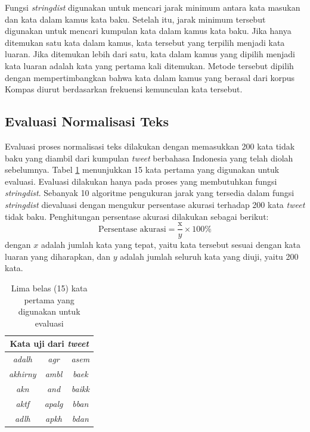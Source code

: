 Fungsi \textit{stringdist} digunakan untuk mencari jarak minimum antara kata masukan dan kata dalam kamus kata baku. Setelah itu, jarak minimum tersebut digunakan untuk mencari kumpulan kata dalam kamus kata baku. Jika hanya ditemukan satu kata dalam kamus, kata tersebut yang terpilih menjadi kata luaran. Jika ditemukan lebih dari satu, kata dalam kamus yang dipilih menjadi kata luaran adalah kata yang pertama kali ditemukan. Metode tersebut dipilih dengan mempertimbangkan bahwa kata dalam kamus yang berasal dari korpus Kompas diurut berdasarkan frekuensi kemunculan kata tersebut.

\subsection{Evaluasi Normalisasi Teks}

Evaluasi proses normalisasi teks dilakukan dengan memasukkan 200 kata tidak baku yang diambil dari kumpulan \textit{tweet} berbahasa Indonesia yang telah diolah sebelumnya. Tabel \ref{tbl:ipb_tweet} menunjukkan 15 kata pertama yang digunakan untuk evaluasi. Evaluasi dilakukan hanya pada proses yang membutuhkan fungsi \textit{stringdist}. Sebanyak 10 algoritme pengukuran jarak yang tersedia dalam fungsi \textit{stringdist} dievaluasi dengan mengukur persentase akurasi terhadap 200 kata \textit{tweet} tidak baku. Penghitungan persentase akurasi dilakukan sebagai berikut:
\begin{equation*}
	\text{Persentase akurasi}=\frac{\text{x}}{y} \times 100\%
\end{equation*}
\noindent
dengan $x$ adalah jumlah kata yang tepat, yaitu kata tersebut sesuai dengan kata luaran yang diharapkan, dan $y$ adalah jumlah seluruh kata yang diuji, yaitu 200 kata.
\begin{table}[ht]
	\captionsetup{justification=justified,singlelinecheck=false}
	\caption{Lima belas (15) kata pertama yang digunakan untuk evaluasi \parencite{saragih2017normalisasi}}
    \label{tbl:ipb_tweet}
    \centering
	\begin{tabular}{|c|c|c|}
		\hline
		\multicolumn{3}{|c|}{\textbf{Kata uji dari \textit{tweet}}} \\ \hline
		\textit{adalh} & \textit{agr} & \textit{asem} \\ 
		\textit{akhirny} & \textit{ambl} & \textit{baek} \\ 
		\textit{akn} & \textit{and} & \textit{baikk} \\ 
		\textit{aktf} & \textit{apalg} & \textit{bban} \\ 
		\textit{adlh} & \textit{apkh} & \textit{bdan} \\ \hline
	\end{tabular}
\end{table}

